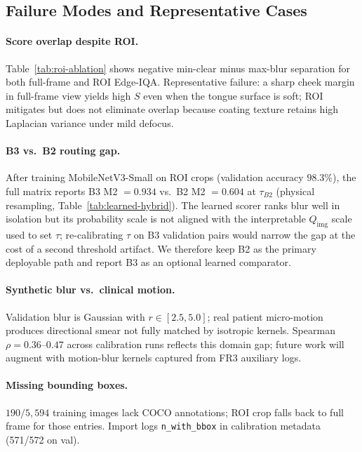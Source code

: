 \subsection{Failure Modes and Representative Cases}
\label{sec:failure-cases}

\paragraph{Score overlap despite ROI.}
Table~\ref{tab:roi-ablation} shows negative min-clear minus max-blur separation for both full-frame and ROI Edge-IQA.
Representative failure: a sharp cheek margin in full-frame view yields high $S$ even when the tongue surface is soft; ROI mitigates but does not eliminate overlap because coating texture retains high Laplacian variance under mild defocus.

\paragraph{B3 vs.\ B2 routing gap.}
After training MobileNetV3-Small on ROI crops (validation accuracy $98.3\%$), the full matrix reports B3 M2 $=0.934$ vs.\ B2 M2 $=0.604$ at $\tau_{B2}$ (physical resampling, Table~\ref{tab:learned-hybrid}).
The learned scorer ranks blur well in isolation but its probability scale is not aligned with the interpretable $Q_{\mathrm{img}}$ scale used to set $\tau$; re-calibrating $\tau$ on B3 validation pairs would narrow the gap at the cost of a second threshold artifact.
We therefore keep B2 as the primary deployable path and report B3 as an optional learned comparator.

\paragraph{Synthetic blur vs.\ clinical motion.}
Validation blur is Gaussian with $r{\in}[2.5,5.0]$; real patient micro-motion produces directional smear not fully matched by isotropic kernels.
Spearman $\rho{=}0.36$--$0.47$ across calibration runs reflects this domain gap; future work will augment with motion-blur kernels captured from FR3 auxiliary logs.

\paragraph{Missing bounding boxes.}
$190/5{,}594$ training images lack COCO annotations; ROI crop falls back to full frame for those entries.
Import logs \texttt{n\_with\_bbox} in calibration metadata (571/572 on val).

